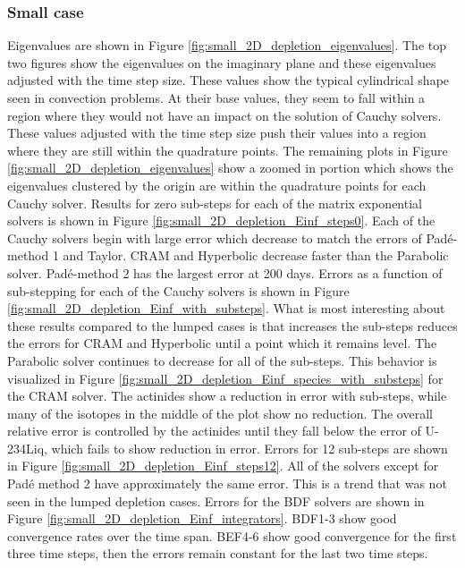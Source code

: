 \subsubsection{Small case}
Eigenvalues are shown in Figure \ref{fig:small_2D_depletion_eigenvalues}. The top two figures show the eigenvalues on the imaginary plane and these eigenvalues adjusted with the time step size. These values show the typical cylindrical shape seen in convection problems. At their base values, they seem to fall within a region where they would not have an impact on the solution of Cauchy solvers. These values adjusted with the time step size push their values into a region where they are still within the quadrature points. The remaining plots in Figure \ref{fig:small_2D_depletion_eigenvalues} show a zoomed in portion which shows the eigenvalues clustered by the origin are within the quadrature points for each Cauchy solver. Results for zero sub-steps for each of the matrix exponential solvers is shown in Figure \ref{fig:small_2D_depletion_Einf_steps0}. Each of the Cauchy solvers begin with large error which decrease to match the errors of Pad\'e-method 1 and Taylor. CRAM and Hyperbolic decrease faster than the Parabolic solver. Pad\'e-method 2 has the largest error at 200 days. Errors as a function of sub-stepping for each of the Cauchy solvers is shown in Figure \ref{fig:small_2D_depletion_Einf_with_substeps}. What is most interesting about these results compared to the lumped cases is that increases the sub-steps reduces the errors for CRAM and Hyperbolic until a point which it remains level. The Parabolic solver continues to decrease for all of the sub-steps. This behavior is visualized in Figure \ref{fig:small_2D_depletion_Einf_species_with_substeps} for the CRAM solver. The actinides show a reduction in error with sub-steps, while many of the isotopes in the middle of the plot show no reduction. The overall relative error is controlled by the actinides until they fall below the error of U-234Liq, which fails to show reduction in error. Errors for 12 sub-steps are shown in Figure \ref{fig:small_2D_depletion_Einf_steps12}. All of the solvers except for Pad\'e method 2 have approximately the same error. This is a trend that was not seen in the lumped depletion cases. Errors for the BDF solvers are shown in Figure \ref{fig:small_2D_depletion_Einf_integrators}. BDF1-3 show good convergence rates over the time span. BEF4-6 show good convergence for the first three time steps, then the errors remain constant for the last two time steps. 

